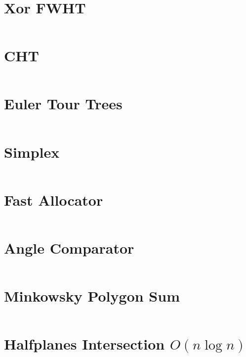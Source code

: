 \documentclass{article}
\begin{document}
\begin{multicols}{2}
\section*{Xor FWHT}
\inputminted[frame=single,breaklines]{cpp}{../fwht.cpp}

\section*{CHT}
\inputminted[frame=single,breaklines]{cpp}{../convex-hull-trick.cpp}

\section*{Euler Tour Trees}
\inputminted[frame=single,breaklines]{cpp}{../euler-tour-trees.cpp}

\section*{Simplex}
\inputminted[frame=single,breaklines]{cpp}{../simplex.cpp}

\section*{Fast Allocator}
\inputminted[frame=single,breaklines]{cpp}{../fast_allocation.cpp}

\section*{Angle Comparator}
\inputminted[frame=single,breaklines]{cpp}{../angle-comparator.cpp}

\section*{Minkowsky Polygon Sum}
\inputminted[frame=single,breaklines]{cpp}{../minkowski-polygons-sum.cpp}

\section*{Halfplanes Intersection $O(n \log n)$}
\inputminted[frame=single,breaklines]{cpp}{../halfplanes_intersection_nlog_trd.cpp}

\end{multicols}
\end{document}
